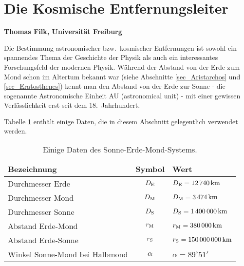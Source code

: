 
\setcounter{page}{1}
\setcounter{section}{0}
\setcounter{figure}{0}
\setcounter{equation}{0}
\setcounter{table}{0}
\setcounter{footnote}{0}

\section*{Die Kosmische Entfernungsleiter}
\vspace{0.2cm}
\noindent
{\bf Thomas Filk, Universit\"at Freiburg}
\vspace{1cm}

\label{chap_Kosm_Entfernung}
\noindent
Die Bestimmung astronomischer bzw.\ kosmischer Entfernungen ist sowohl ein
spannendes Thema der Geschichte der Physik als auch ein interessantes
Forschungsfeld der modernen Physik. W\"ahrend der Abstand von der Erde zum
Mond schon im Altertum bekannt war (siehe Abschnitte \ref{sec_Aristarchos} und \ref{sec_Eratosthenes}) 
kennt man den Abstand von der Erde zur Sonne - die sogenannte Astronomische
Einheit AU (astronomical unit) - mit einer gewissen Verl\"asslichkeit erst seit dem 18.\ Jahrhundert.

Tabelle \ref{tab_Arist} enth\"alt einige Daten, die in diesem Abschnitt gelegentlich
verwendet werden.%

\begin{table}[htb]
\begin{tabular}{l|c|l}
Bezeichnung & Symbol & Wert \\ \hline
Durchmesser Erde & $D_{\rm E}$ &  $D_{\rm E}= 12\,740\,{\rm km}$ \\
Durchmesser Mond & $D_{\rm M}$ &  $D_{\rm M}= 3\,474\,{\rm km}$ \\
Durchmesser Sonne & $D_{\rm S}$ &  $D_{\rm S}=  1\,400\,000 \,{\rm km}$ \\
Abstand Erde-Mond & $r_{\rm M}$  &  $r_{\rm M} = 380\,000\,{\rm km}$ \\
Abstand Erde-Sonne & $r_{\rm S}$  &  $r_{\rm S} = 150\,000\,000\,{\rm km}$ \\
Winkel Sonne-Mond bei Halbmond & $\alpha$ & $\alpha = 89^\circ 51'$ \\ \hline
\end{tabular}
\caption{\label{tab_Arist}%
Einige Daten des Sonne-Erde-Mond-Systems.}
\end{table}

